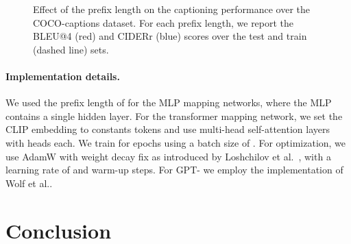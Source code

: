 \begin{figure}
\begin{subfigure}{\textwidth}






















%
\label{fig:prefix_legnth_transformer}
\end{subfigure}
\caption{Effect of the prefix length on the captioning performance over the COCO-captions dataset. For each prefix length, we report the BLEU@4 (red) and CIDERr (blue) scores over the test and train (dashed line) sets.}
\label{fig:prefix_legnth}
\end{figure} 




\paragraph{Implementation details.}


We used the prefix length of  for the MLP mapping networks, where the MLP contains a single hidden layer. For the transformer mapping network, we set the CLIP embedding to  constants tokens and use  multi-head self-attention layers with  heads each. We train for  epochs using a batch size of . For optimization, we use AdamW \cite{Kingma2015AdamAM} with weight decay fix as introduced by Loshchilov et al.~\cite{loshchilov2017decoupled}, with a learning rate of  and  warm-up steps. For GPT- we employ the implementation of Wolf et al.\cite{wolf-etal-2020-transformers}.





\section{Conclusion}

